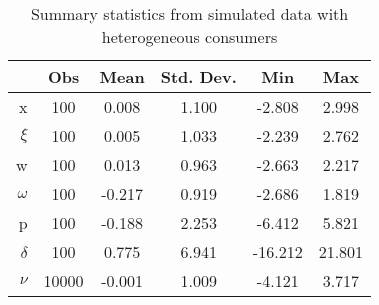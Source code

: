 \begin{table}[h]
\centering
\caption{Summary statistics from simulated data with heterogeneous consumers}
\begin{tabular}{r|ccccc}
\toprule
  & Obs & Mean   & Std. Dev. & Min     & Max    \\ \hline
x & 100 &  0.008 &     1.100 &  -2.808 &  2.998 \\
$\xi$ & 100 &  0.005 &     1.033 &  -2.239 &  2.762 \\
w & 100 &  0.013 &     0.963 &  -2.663 &  2.217 \\
$\omega$ & 100 & -0.217 &     0.919 &  -2.686 &  1.819 \\
p & 100 & -0.188 &     2.253 &  -6.412 &  5.821 \\
$\delta$ & 100 &  0.775 &     6.941 & -16.212 & 21.801 \\
$\nu$ & 10000 & -0.001 & 1.009 & -4.121 & 3.717 \\
\bottomrule
\end{tabular}
\end{table}